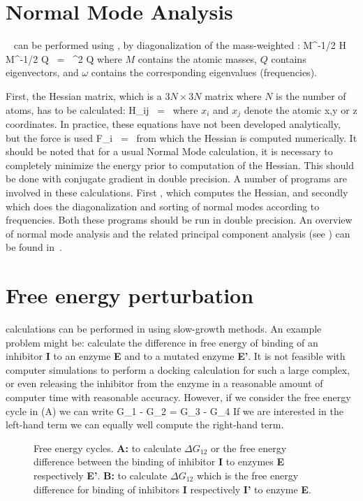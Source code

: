 \section{Normal Mode Analysis}
~\cite{Levitt83,Go83,BBrooks83b} 
can be performed using {\gromacs}, by diagonalization of the mass-weighted
:
\beq
M^{-1/2} H M^{-1/2} Q   ~=~     \omega^2 Q
\eeq
where $M$ contains the atomic masses, $Q$ contains eigenvectors, and $\omega$
contains the corresponding eigenvalues (frequencies).

First, the Hessian matrix, which is a $3N \times 3N$ matrix where $N$
is the number of atoms, has to be calculated:
\beq
H_{ij}  ~=~     
\eeq
where $x_i$ and $x_j$ denote the atomic x,y or z coordinates.
In practice, these equations have not been developed analytically, but
the force is used
\beq
F_i     ~=~     
\eeq
from which the Hessian is computed numerically. It should be noted that
for a usual Normal Mode calculation, it is necessary to completely minimize 
the energy prior to computation of the Hessian. This should be done
with conjugate gradient in double precision.
A number of {\gromacs} programs are involved in these
calculations. First {\tt {}}, which computes the Hessian,
and secondly {\tt {}} which does the diagonalization and
sorting of normal modes according to frequencies. Both these programs
should be run in double precision. An overview of normal mode analysis
and the related principal component analysis (see )
can be found in~\cite{Hayward95b}.

\section{Free energy perturbation}
\label{sec:fepalg}
 calculations can be performed
in {\gromacs} using slow-growth methods. An example problem might be:
calculate the difference in free energy of binding of an inhibitor {\bf I}
to an enzyme {\bf E} and to a mutated enzyme {\bf E'}.
It is not feasible with computer simulations to perform a docking
calculation for such a large complex, or even releasing the inhibitor from
the enzyme in a reasonable amount of computer time with reasonable accuracy.
However, if we consider the free energy cycle in (A)
we can write
\beq
\Delta G_1 - \Delta G_2 =       \Delta G_3 - \Delta G_4
\label{eqn:ddg}
\eeq
If we are interested in the left-hand term we can equally well compute
the right-hand term.
\begin{figure}
\centerline{\hspace{2cm}}
\caption[Free energy cycles.]{Free energy cycles. {\bf A:} to
calculate $\Delta G_{12}$ or the free energy difference between the
binding of inhibitor {\bf I} to enzymes {\bf E} respectively {\bf
E'}. {\bf B:} to calculate $\Delta G_{12}$ which is the free energy
difference for binding of inhibitors {\bf I} respectively {\bf I'} to
enzyme {\bf E}.}
\label{fig:free}
\end{figure}

